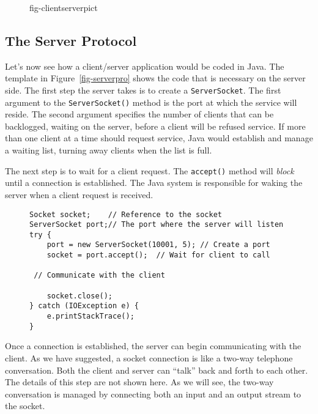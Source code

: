 
\begin{figure}[hbt]
{fig-clientserverpict}
\end{figure}

\subsection{The Server Protocol}
\noindent Let's now see how a client/server application would be coded in Java.
The template in Figure~\ref{fig-serverpro} shows the code that is
necessary on the server side.   The first step the server takes is to
create a {\tt ServerSocket}.  The first argument to the
{\tt ServerSocket()} method is the port at which the service will
reside.  The second argument specifies the number of clients that can
be backlogged, waiting on the server, before a client will be refused
service.   If more than one client at a time should request service,
Java would establish and manage a waiting list, turning away clients
when the list is full.

The next step is to wait for a client request.  The {\tt accept()}
method will {\it block} until a connection is established.   The Java
system is responsible for waking the server when a client request
is received.

\begin{figure}[thb]
\jjjprogstart
\begin{jjjlisting}
\begin{lstlisting}
Socket socket;    // Reference to the socket
ServerSocket port;// The port where the server will listen
try {
    port = new ServerSocket(10001, 5); // Create a port
    socket = port.accept();  // Wait for client to call

 // Communicate with the client

    socket.close();
} catch (IOException e) {
    e.printStackTrace();
}
\end{lstlisting}
\end{jjjlisting}
\end{figure}

Once a connection is established, the server can begin communicating
with the client.  As we have suggested, a socket connection is like
a two-way telephone conversation.  Both the client and server can
``talk'' back and forth to each other.  The details of this step
are not shown here.  As we will see, the two-way conversation
is managed by connecting both an input and an output stream to
the socket.

